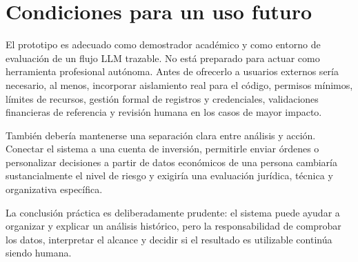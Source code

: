 \section{Condiciones para un uso futuro}

El prototipo es adecuado como demostrador académico y como entorno de evaluación de un flujo LLM trazable. No está preparado para actuar como herramienta profesional autónoma. Antes de ofrecerlo a usuarios externos sería necesario, al menos, incorporar aislamiento real para el código, permisos mínimos, límites de recursos, gestión formal de registros y credenciales, validaciones financieras de referencia y revisión humana en los casos de mayor impacto.

También debería mantenerse una separación clara entre análisis y acción. Conectar el sistema a una cuenta de inversión, permitirle enviar órdenes o personalizar decisiones a partir de datos económicos de una persona cambiaría sustancialmente el nivel de riesgo y exigiría una evaluación jurídica, técnica y organizativa específica.

La conclusión práctica es deliberadamente prudente: el sistema puede ayudar a organizar y explicar un análisis histórico, pero la responsabilidad de comprobar los datos, interpretar el alcance y decidir si el resultado es utilizable continúa siendo humana.
